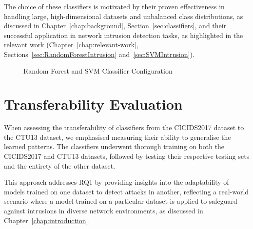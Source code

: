 The choice of these classifiers is motivated by their proven effectiveness in handling large, high-dimensional datasets and unbalanced class distributions, as discussed in Chapter~\ref{chap:background}, Section~\ref{sec:classifiers}, and their successful application in network intrusion detection tasks, as highlighted in the relevant work (Chapter~\ref{chap:relevant-work}, Sections~\ref{sec:RandomForestIntrusion} and~\ref{sec:SVMIntrusion}).

\begin{figure}[H]
    \centering
    \caption{Random Forest and SVM Classifier Configuration}\label{fig:RandomForest+SVMClassifierClassifierConfig}
\end{figure}

\section{Transferability Evaluation}\label{sec:TransferabilityEvaluation}

When assessing the transferability of classifiers from the CICIDS2017 dataset to the CTU13 dataset, we emphasised measuring their ability to generalise the learned patterns. The classifiers underwent thorough training on both the CICIDS2017 and CTU13 datasets, followed by testing their respective testing sets and the entirety of the other dataset.

This approach addresses RQ1 by providing insights into the adaptability of models trained on one dataset to detect attacks in another, reflecting a real-world scenario where a model trained on a particular dataset is applied to safeguard against intrusions in diverse network environments, as discussed in Chapter~\ref{chap:introduction}.

